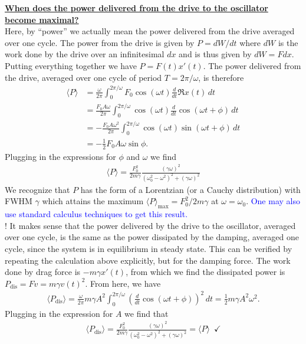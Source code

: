 \documentclass{book}
\theoremstyle{definition}
\newcommand{\f}[2]{\frac{#1}{#2}}
\newcommand{\lp}{\left(}
\newcommand{\rp}{\right)}
\begin{document}
\noindent \textbf{\underline{When does the power delivered from the drive to the oscillator become maximal?}} \\

Here, by ``power'' we actually mean the power delivered from the drive averaged over one cycle. The power from the drive is given by $P = dW/dt$ where $dW$ is the work done by the drive over an infinitesimal $dx$ and is thus given by $dW = Fdx$.  Putting everything together we have $P = F(t)x'(t)$. The power delivered from the drive, averaged over one cycle of period $T = 2\pi / \omega$, is therefore
\begin{align*}
\langle P \rangle 
&= \f{\omega}{2\pi}\int_{0}^{2\pi/\omega} F_0 \cos(\omega t) \f{d}{dt} \Re{x(t)} \,dt \\
&= \f{F_0 A \omega}{2\pi}  \int_{0}^{2\pi/\omega} \cos(\omega t)  \f{d}{dt} \cos\lp \omega t + \phi \rp \,dt \\
&= -\f{F_0 A \omega^2}{2\pi}  \int_{0}^{2\pi/\omega} \cos(\omega t) \sin\lp \omega t + \phi \rp \,dt \\
&= -\f{1}{2}F_0 A \omega \sin \phi.
\end{align*} 
Plugging in the expressions for $\phi$ and $\omega$ we find 
\begin{align*}
\boxed{\langle P \rangle = \f{F_0^2 }{2m\gamma}\f{(\gamma\omega)^2}{(\omega_0^2 - \omega^2)^2 + (\gamma \omega)^2}}
\end{align*}
We recognize that $P$ has the form of a Lorentzian (or a Cauchy distribution) with FWHM $\gamma$ which attains the maximum $\langle P \rangle_\text{max} = F_0^2/2m\gamma$ at $\omega = \omega_0$.  \textcolor{blue}{One may also use standard calculus techniques to get this result.} \\



\noindent $\boxed{\textbf{!}}$ It makes sense that the power delivered by the drive to the oscillator, averaged over one cycle, is the same as the power dissipated by the damping, averaged one cycle, since the system is in equilibrium in steady state. This can be verified by repeating the calculation above explicitly, but for the damping force. The work done by drag force is $-m\gamma x'(t)$, from which we find the dissipated power is $P_\text{dis} = Fv = m\gamma v(t)^2$. From here, we have
\begin{align*}
\langle P_\text{dis}\rangle = \f{\omega}{2\pi}m\gamma A^2\int_0^{2\pi/\omega} \lp \f{d}{dt}\cos(\omega t + \phi)\rp^2\,dt = \f{1}{2}m\gamma A^2\omega^2.
\end{align*}
Plugging in the expression for $A$ we find that
\begin{align*}
\langle P_\text{dis}\rangle = \f{F_0^2}{2m\gamma} \f{(\gamma\omega)^2}{(\omega_0^2 - \omega^2)^2 + (\gamma \omega)^2} = \langle P \rangle \,\,\,\checkmark
\end{align*}
\end{document}
